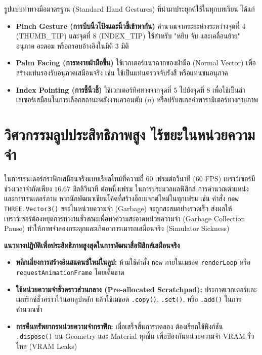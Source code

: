 รูปแบบท่าทางมือมาตรฐาน (Standard Hand Gestures) ที่นำมาประยุกต์ใช้ในทุกบทเรียน ได้แก่
\begin{itemize}
    \item \textbf{Pinch Gesture (การบีบนิ้วโป้งและนิ้วชี้เข้าหากัน)} คำนวณจากระยะห่างระหว่างจุดที่ 4 (THUMB\_TIP) และจุดที่ 8 (INDEX\_TIP) ใช้สำหรับ "หยิบ จับ และเคลื่อนย้าย" อนุภาค อะตอม หรือกรอบอ้างอิงในมิติ 3 มิติ
    \item \textbf{Palm Facing (การหงายฝ่ามือขึ้น)} ใช้เวกเตอร์แนวฉากของฝ่ามือ (Normal Vector) เพื่อสร้างแท่นรองรับอนุภาคเสมือนจริง เช่น ใช้เป็นแท่นตรวจจับรังสี หรือแท่นชนอนุภาค
    \item \textbf{Index Pointing (การชี้นิ้วชี้)} ใช้เวกเตอร์ทิศทางจากจุดที่ 5 ไปยังจุดที่ 8 เพื่อใช้เป็นลำเลเซอร์เสมือนในการเลือกสถานะพลังงานควอนตัม ($n$) หรือปรับสเกลค่าพารามิเตอร์ทางกายภาพ
\end{itemize}

\section{วิศวกรรมลูปประสิทธิภาพสูง ไร้ขยะในหน่วยความจำ}

ในการเรนเดอร์กราฟิกเสมือนจริงแบบเรียลไทม์ที่ความถี่ 60 เฟรมต่อวินาที (60 FPS) เบราว์เซอร์มีช่วงเวลาจำกัดเพียง $16.67\text{ มิลลิวินาที}$ ต่อหนึ่งเฟรม ในการประมวลผลฟิสิกส์ การคำนวณตำแหน่ง และการเรนเดอร์ภาพ หากนักพัฒนาเขียนโค้ดที่สร้างอ็อบเจกต์ใหม่ในทุกเฟรม เช่น คำสั่ง \texttt{new THREE.Vector3()} ขยะในหน่วยความจำ (Garbage) จะถูกสะสมอย่างรวดเร็ว ส่งผลให้เบราว์เซอร์ต้องหยุดการทำงานชั่วขณะเพื่อทำความสะอาดหน่วยความจำ (Garbage Collection Pause) ทำให้ภาพจำลองกระตุกและเกิดอาการเมารถเสมือนจริง (Simulator Sickness)

\begin{pitfallbox}
\textbf{แนวทางปฏิบัติเพื่อประสิทธิภาพสูงสุดในการพัฒนาสื่อฟิสิกส์เสมือนจริง}
\begin{itemize}
    \item \textbf{หลีกเลี่ยงการสร้างอินสแตนซ์ใหม่ในลูป:} ห้ามใช้คำสั่ง \texttt{new} ภายในเมธอด \texttt{renderLoop} หรือ \texttt{requestAnimationFrame} โดยเด็ดขาด
    \item \textbf{ใช้หน่วยความจำชั่วคราวส่วนกลาง (Pre-allocated Scratchpad):} ประกาศเวกเตอร์และเมทริกซ์ชั่วคราวไว้นอกลูปหลัก แล้วใช้เมธอด \texttt{.copy()}, \texttt{.set()}, หรือ \texttt{.add()} ในการคำนวณซ้ำ
    \item \textbf{การคืนทรัพยากรหน่วยความจำกราฟิก:} เมื่อเสร็จสิ้นการทดลอง ต้องเรียกใช้ฟังก์ชัน \texttt{.dispose()} บน Geometry และ Material ทุกชิ้น เพื่อป้องกันหน่วยความจำ VRAM รั่วไหล (VRAM Leaks)
\end{itemize}
\end{pitfallbox}


